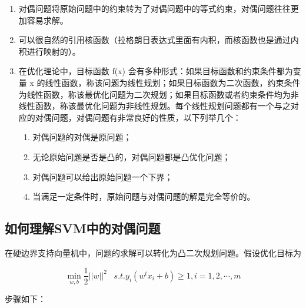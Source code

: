 \begin{enumerate}\itemsep0em 
		\item 对偶问题将原始问题中的约束转为了对偶问题中的等式约束，对偶问题往往更加容易求解。
		\item 可以很自然的引用核函数（拉格朗日表达式里面有内积，而核函数也是通过内积进行映射的）。
		\item 在优化理论中，目标函数 f(x) 会有多种形式：如果目标函数和约束条件都为变量 x 的线性函数，称该问题为线性规划；如果目标函数为二次函数，约束条件为线性函数，称该最优化问题为二次规划；如果目标函数或者约束条件均为非线性函数，称该最优化问题为非线性规划。每个线性规划问题都有一个与之对应的对偶问题，对偶问题有非常良好的性质，以下列举几个：

		\begin{enumerate}\itemsep0em 
				\item  对偶问题的对偶是原问题；
				\item  无论原始问题是否是凸的，对偶问题都是凸优化问题；
				\item  对偶问题可以给出原始问题一个下界；
				\item  当满足一定条件时，原始问题与对偶问题的解是完全等价的。
		\end{enumerate}
\end{enumerate}

\subsection{如何理解SVM中的对偶问题}

在硬边界支持向量机中，问题的求解可以转化为凸二次规划问题。假设优化目标为

\begin{equation} \label{eq:2.1}
\min_{ w, b}\frac{1}{2}|| w||^2\;\;\;s.t. y_i( w^t x_i+b)\geqslant 1, i=1,2,\cdots,m
\end{equation}

步骤如下：

